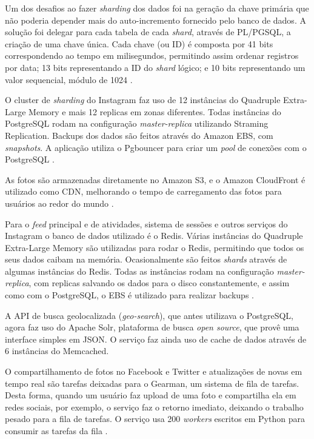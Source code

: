\documentclass[diss]{template/setrem}
\begin{document}
Um dos desafios ao fazer \emph{sharding} dos dados foi na geração da chave primária que não poderia depender mais do auto-incremento fornecido pelo banco de dados. A solução foi delegar para cada tabela de cada \emph{shard}, através de PL/PGSQL, a criação de uma chave única. Cada chave (ou ID) é composta por 41 bits correspondendo ao tempo em milisegundos, permitindo assim ordenar registros por data; 13 bits representando a ID do \emph{shard} lógico; e 10 bits representando um valor sequencial, módulo de 1024 \citep{Instagram2011a}.

O cluster de \emph{sharding} do Instagram faz uso de 12 instâncias do Quadruple Extra-Large Memory e mais 12 replicas em zonas diferentes. Todas instâncias do PostgreSQL rodam na configuração \emph{master-replica} utilizando Straming Replication. Backups dos dados são feitos através do Amazon EBS, com \emph{snapshots}. A aplicação utiliza o Pgbouncer para criar um \emph{pool} de conexões com o PostgreSQL \citep{Instagram2011}.

As fotos são armazenadas diretamente no Amazon S3, e o Amazon CloudFront é utilizado como CDN, melhorando o tempo de carregamento das fotos para usuários ao redor do mundo \citep{Instagram2011}.

Para o \emph{feed} principal e de atividades, sistema de sessões e outros serviços do Instagram o banco de dados utilizado é o Redis. Várias instâncias do Quadruple Extra-Large Memory são utilizadas para rodar o Redis, permitindo que todos os seus dados caibam na memória. Ocasionalmente são feitos \emph{shards} através de algumas instâncias do Redis. Todas as instâncias rodam na configuração \emph{master-replica}, com replicas salvando os dados para o disco constantemente, e assim como com o PostgreSQL, o EBS é utilizado para realizar backups \citep{Instagram2011}.

A API de busca geolocalizada (\emph{geo-search}), que antes utilizava o PostgreSQL, agora faz uso do Apache Solr, plataforma de busca \emph{open source}, que provê uma interface simples em JSON. O serviço faz ainda uso de cache de dados através de 6 instâncias do Memcached.

O compartilhamento de fotos no Facebook e Twitter e atualizações de novas em tempo real são tarefas deixadas para o Gearman, um sistema de fila de tarefas. Desta forma, quando um usuário faz upload de uma foto e compartilha ela em redes sociais, por exemplo, o serviço faz o retorno imediato, deixando o trabalho pesado para a fila de tarefas. O serviço usa 200 \emph{workers} escritos em Python para consumir as tarefas da fila \citep{Instagram2011}.
\end{document}
